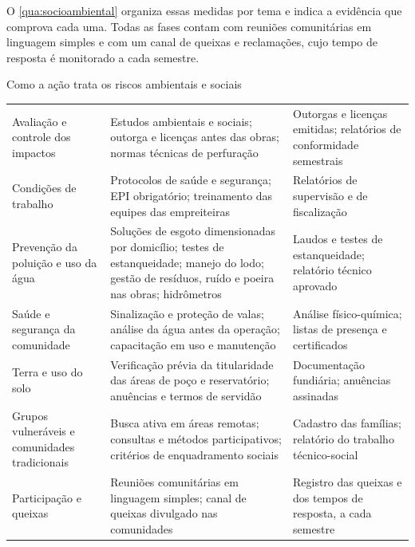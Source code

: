 O \autoref{qua:socioambiental} organiza essas medidas por tema e indica a
evidência que comprova cada uma. Todas as fases contam com reuniões
comunitárias em linguagem simples e com um canal de queixas e reclamações,
cujo tempo de resposta é monitorado a cada semestre.

\begin{quadro}[H]
\caption{Como a ação trata os riscos ambientais e sociais}
\label{qua:socioambiental}
\footnotesize
\renewcommand{\arraystretch}{1.25}
\begin{tabularx}{\textwidth}{|P{3.3cm}|L|P{4.2cm}|}
\hline
{} &  &  \\ \hline
Avaliação e controle dos impactos &
  Estudos ambientais e sociais; outorga e licenças antes das obras; normas
  técnicas de perfuração & Outorgas e licenças emitidas; relatórios de
  conformidade semestrais \\ \hline
Condições de trabalho &
  Protocolos de saúde e segurança; EPI obrigatório; treinamento das equipes
  das empreiteiras & Relatórios de supervisão e de fiscalização \\ \hline
Prevenção da poluição e uso da água &
  Soluções de esgoto dimensionadas por domicílio; testes de estanqueidade;
  manejo do lodo; gestão de resíduos, ruído e poeira nas obras; hidrômetros &
  Laudos e testes de estanqueidade; relatório técnico aprovado \\ \hline
Saúde e segurança da comunidade &
  Sinalização e proteção de valas; análise da água antes da operação;
  capacitação em uso e manutenção & Análise físico-química; listas de
  presença e certificados \\ \hline
Terra e uso do solo &
  Verificação prévia da titularidade das áreas de poço e reservatório;
  anuências e termos de servidão & Documentação fundiária; anuências
  assinadas \\ \hline
Grupos vulneráveis e comunidades tradicionais &
  Busca ativa em áreas remotas; consultas e métodos participativos; critérios
  de enquadramento sociais & Cadastro das famílias; relatório do trabalho
  técnico-social \\ \hline
Participação e queixas &
  Reuniões comunitárias em linguagem simples; canal de queixas divulgado nas
  comunidades & Registro das queixas e dos tempos de resposta, a cada
  semestre \\ \hline
\end{tabularx}
\end{quadro}

